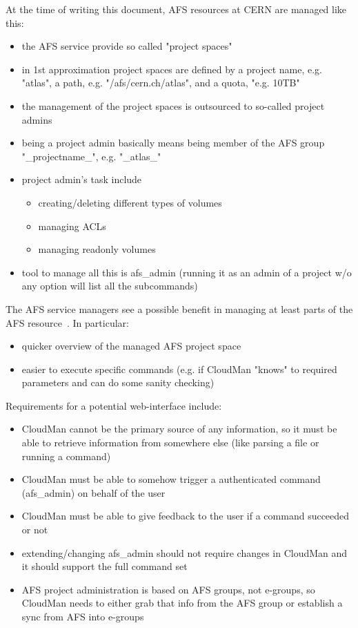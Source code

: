 At the time of writing this document, AFS resources at CERN are managed like this:

\begin{itemize}
\item the AFS service provide so called "project spaces"
\item in 1st approximation project spaces are defined by a project name, e.g. "atlas", a path, e.g. "/afs/cern.ch/atlas", and a quota, "e.g. 10TB"
\item the management of the project spaces is outsourced to so-called project admins
\item being a project admin basically means being member of the AFS group "\_projectname\_", e.g. "\_atlas\_"
\item project admin's task include
\begin{itemize}
    \item creating/deleting different types of volumes
    \item managing ACLs
    \item managing readonly volumes
\end{itemize}
\item tool to manage all this is afs\_admin (running it as an admin of a project w/o any option will list all the subcommands)    
\end{itemize}

The AFS service managers see a possible benefit in managing at least parts of the AFS resource~\cite{arne}. In particular:

\begin{itemize}
\item quicker overview of the managed AFS project space
\item easier to execute specific commands (e.g. if CloudMan "knows" to required parameters and can do some sanity checking)
\end{itemize}

Requirements for a potential web-interface include:

\begin{itemize}
\item CloudMan cannot be the primary source of any information, so it must be able to retrieve information from somewhere else (like parsing a file or running a command)
\item CloudMan must be able to somehow trigger a authenticated command (afs\_admin) on behalf of the user
\item CloudMan must be able to give feedback to the user if a command succeeded or not
\item extending/changing afs\_admin should not require changes in CloudMan and it should support the full command set
\item AFS project administration is based on AFS groups, not e-groups, so CloudMan needs to either grab that info from the AFS group or establish a sync from AFS into e-groups 
\end{itemize}
